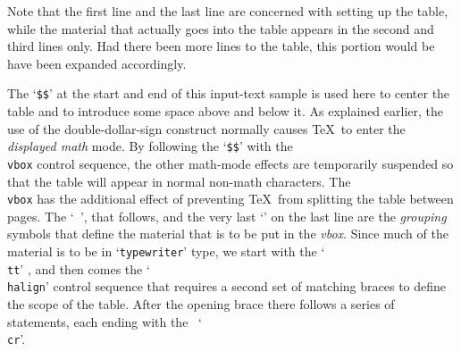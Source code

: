 \vskip 10pt
\vbox{\tt {}}

Note that the first line and the last line are concerned with setting up
the table, while the material that actually goes into the table appears in
the second and third lines only.  Had there been more lines to the table,
this portion would be have been expanded accordingly.

The `{\tt \$\$}' at the start and end of this input-text sample is used
here to center the table and to introduce some space above and below it.
As explained earlier, the use of the double-dollar-sign construct normally
causes \TeX\ to enter the {\sl displayed math} mode.  By following the
`{\tt \$\$}' with the {\tt \\vbox} control sequence, the other math-mode
effects are temporarily suspended so that the table will appear in normal
non-math characters.  The {\tt \\vbox} has the additional effect of
preventing \TeX\ from splitting the table between pages.  The `{\tt
\lbr}', that follows, and the very last `{\tt \rbr}' on the last line are
the {\sl grouping} symbols that define the material that is to be put in
the {\sl vbox}.  Since much of the material is to be in `{\tt typewriter}'
type, we start with the `{\tt \\tt}' \cs, and then comes the `{\tt
\\halign}' control sequence that requires a second set of matching braces
to define the scope of the table. After the opening brace there follows a
series of statements, each ending with the \cs\ `{\tt \\cr}'.

